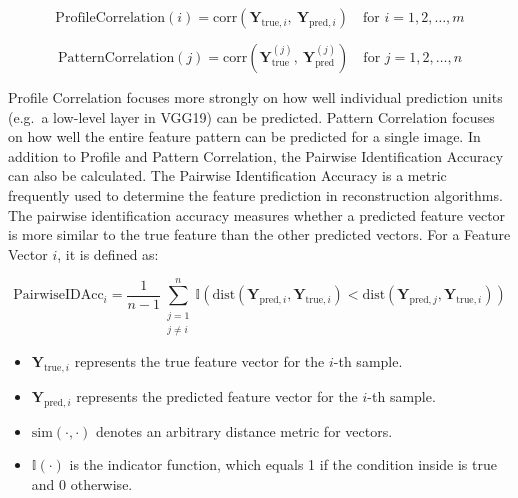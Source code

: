 \[
\text{ProfileCorrelation}(i) = \text{corr}\left( \mathbf{Y}_{\text{true}, i},\ \mathbf{Y}_{\text{pred}, i} \right) \quad \text{for } i = 1, 2, \ldots, m
\]

\[
\text{PatternCorrelation}(j) = \text{corr}\left( \mathbf{Y}_{\text{true}}^{(j)},\ \mathbf{Y}_{\text{pred}}^{(j)} \right) \quad \text{for } j = 1, 2, \ldots, n
\]

Profile Correlation focuses more strongly on how well individual prediction units (e.g.\ a low-level layer in VGG19) can be predicted. Pattern Correlation focuses on how well the entire feature pattern can be predicted for a single image. 
In addition to Profile and Pattern Correlation, the Pairwise Identification Accuracy can also be calculated. The Pairwise Identification Accuracy is a metric frequently used to determine the feature prediction in reconstruction algorithms\cite{shirakawaSpuriousReconstructionBrain2024}. 
The pairwise identification accuracy measures whether a predicted feature vector is more similar to the true feature than the other predicted vectors. For a Feature Vector $i$, it is defined as:



\[ %
\text{PairwiseIDAcc}_i = \frac{1}{n-1} \sum_{\substack{j=1 \\ j \neq i}}^{n} \mathbb{I} \left(  \text{dist}\left(\mathbf{Y}_{\text{pred},i}, \mathbf{Y}_{\text{true},i}\right)  < \text{dist}\left(\mathbf{Y}_{\text{pred},j}, \mathbf{Y}_{\text{true},i} \right) \right)
\]

\begin{itemize}
    \item \( \mathbf{Y}_{\text{true},i} \) represents the true feature vector for the \( i \)-th sample.
    \item \( \mathbf{Y}_{\text{pred},i} \) represents the predicted feature vector for the \( i \)-th sample.
    \item \( \text{sim}\left( \cdot, \cdot \right) \) denotes an arbitrary distance metric for vectors.
    \item \( \mathbb{I}(\cdot) \) is the indicator function, which equals 1 if the condition inside is true and 0 otherwise.
\end{itemize}

